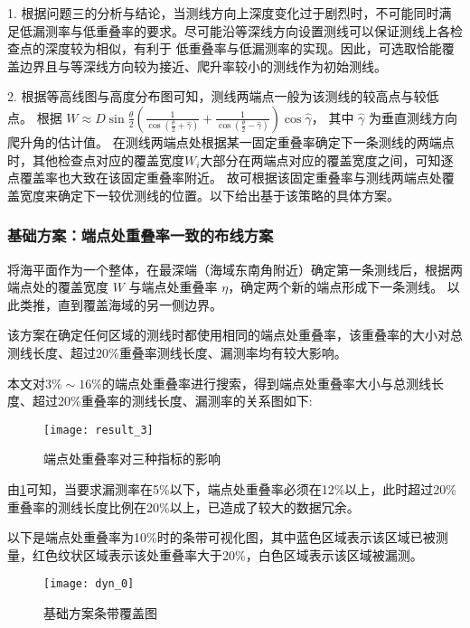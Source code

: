 \documentclass[withoutpreface,bwprint]{cumcmthesis} %
\begin{document}
        1. 根据问题三的分析与结论，当测线方向上深度变化过于剧烈时，不可能同时满足低漏测率与低重叠率的要求。尽可能沿等深线方向设置测线可以保证测线上各检查点的深度较为相似，有利于
        低重叠率与低漏测率的实现。因此，可选取恰能覆盖边界且与等深线方向较为接近、爬升率较小的测线作为初始测线。

        2. 根据等高线图与高度分布图可知，测线两端点一般为该测线的较高点与较低点。
        根据
        $W \approx D\sin\frac{\theta}{2}(\frac{1}{\cos(\frac{\theta}{2}+\hat{\gamma})} + \frac{1}{\cos(\frac{\theta}{2} - \hat{\gamma})})\cos\hat{\gamma}$，
        其中 $\hat{\gamma}$ 为垂直测线方向爬升角的估计值。
        在测线两端点处根据某一固定重叠率确定下一条测线的两端点时，其他检查点对应的覆盖宽度$W_i$大部分在两端点对应的覆盖宽度之间，可知逐点覆盖率也大致在该固定重叠率附近。
        故可根据该固定重叠率与测线两端点处覆盖宽度来确定下一较优测线的位置。以下给出基于该策略的具体方案。

        \subsubsection{基础方案：端点处重叠率一致的布线方案}
        将海平面作为一个整体，在最深端（海域东南角附近）确定第一条测线后，根据两端点处的覆盖宽度 $W$ 与端点处重叠率 $\eta$，确定两个新的端点形成下一条测线。
        以此类推，直到覆盖海域的另一侧边界。

        该方案在确定任何区域的测线时都使用相同的端点处重叠率，该重叠率的大小对总测线长度、超过20\%重叠率测线长度、漏测率均有较大影响。
        
        本文对$3\% \sim 16\%$的端点处重叠率进行搜索，得到端点处重叠率大小与总测线长度、超过20\%重叠率的测线长度、漏测率的关系图如下:
        \begin{figure}[H]
            \centering
            \texttt{[image: result\_3]}
            \caption{端点处重叠率对三种指标的影响}
            \label{fig:result_3}
        \end{figure}
        由\cref{fig:result_3}可知，当要求漏测率在5\%以下，端点处重叠率必须在12\%以上，此时超过20\%重叠率的测线长度比例在20\%以上，已造成了较大的数据冗余。

        以下是端点处重叠率为10\%时的条带可视化图，其中蓝色区域表示该区域已被测量，红色纹状区域表示该处重叠率大于20\%，白色区域表示该区域被漏测。
        \begin{figure}[H]
            \centering
            \texttt{[image: dyn\_0]}
            \caption{基础方案条带覆盖图}
            \label{fig:dyn_0}
        \end{figure}
\end{document}
